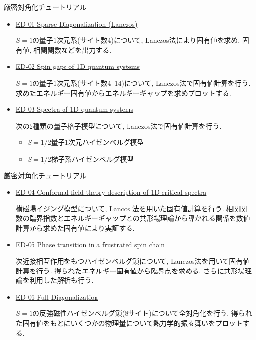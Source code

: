 \begin{frame}{厳密対角化チュートリアル}
  \begin{itemize}
  \item \href{http://alps.comp-phys.org/mediawiki/index.php/ALPS_2_Tutorials:ED-01_SparseDiagonalization/ja}{ED-01 Sparse Diagonalization (Lanczos)
}

    $S=1$の量子1次元系(サイト数4)について, Lanczos法により固有値を求め, 固有値, 相関関数などを出力する.

  \item \href{http://alps.comp-phys.org/mediawiki/index.php/ALPS_2_Tutorials:ED-02_Gaps/ja}{ED-02 Spin gaps of 1D quantum systems}
    
    $S=1$の量子1次元系(サイト数4--14)について, Lanczos法で固有値計算を行う. 求めたエネルギー固有値からエネルギーギャップを求めプロットする.

  \item \href{http://alps.comp-phys.org/mediawiki/index.php/ALPS_2_Tutorials:ED-03_Spectra/ja}{ED-03 Spectra of 1D quantum systems}

    次の2種類の量子格子模型について, Lanczos法で固有値計算を行う.
    \begin{itemize}
      \item $S=1/2$量子1次元ハイゼンベルグ模型
      \item $S=1/2$梯子系ハイゼンベルグ模型
    \end{itemize}
  \end{itemize}
\end{frame}

\begin{frame}{厳密対角化チュートリアル}
  \begin{itemize}
  \item \href{http://alps.comp-phys.org/mediawiki/index.php/ALPS_2_Tutorials:ED-04_Criticality/ja}{ED-04 Conformal field theory description of 1D critical spectra}

    横磁場イジング模型について, Lancos 法を用いた固有値計算を行う. 相関関数の臨界指数とエネルギーギャップとの共形場理論から導かれる関係を数値計算から求めた固有値により実証する.

  \item \href{http://alps.comp-phys.org/mediawiki/index.php/ALPS_2_Tutorials:ED-05_ED_Phase_Transition/ja}{ED-05 Phase transition in a frustrated spin chain}

    次近接相互作用をもつハイゼンベルグ鎖について, Lanczos法を用いて固有値計算を行う. 得られたエネルギー固有値から臨界点を求める. さらに共形場理論を利用した解析も行う.

  \item \href{http://alps.comp-phys.org/mediawiki/index.php/ALPS_2_Tutorials:ED-06_FullDiagonalization/ja}{ED-06 Full Diagonalization}

    $S=1$の反強磁性ハイゼンベルグ鎖(8サイト)について全対角化を行う. 得られた固有値をもとにいくつかの物理量について熱力学的振る舞いをプロットする.
  \end{itemize}
\end{frame}


